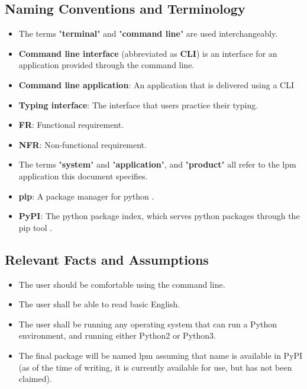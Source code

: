 \documentclass[12pt, titlepage]{article}
\begin{document}
\subsection{Naming Conventions and Terminology}
\begin{itemize}
    \item The terms "\textbf{terminal}" and "\textbf{command line}" are used interchangeably.
    \item \textbf{Command line interface} (abbreviated as \textbf{CLI}) is an interface for an application provided through the command line.
    \item \textbf{Command line application}: An application that is delivered using a CLI
    \item \textbf{Typing interface}: The interface that users practice their typing.
    \item \textbf{FR}: Functional requirement.
    \item \textbf{NFR}: Non-functional requirement.
    \item The terms "\textbf{system}" and "\textbf{application}", and "\textbf{product}" all refer to the lpm application this document specifies.
    \item \textbf{pip}: A package manager for python \citep{pip}.
    \item \textbf{PyPI}: The python package index, which serves python packages through the pip tool \citep{pypi}.
\end{itemize}

\subsection{Relevant Facts and Assumptions}
\begin{itemize}
    \item The user should be comfortable using the command line.
    \item The user shall be able to read basic English.
    \item The user shall be running any operating system that can run a Python environment, and running either Python2 or Python3.
    \item The final package will be named lpm assuming that name is available in PyPI (as of the time of writing, it is currently available for use, but has not been claimed).
\end{itemize}

\end{document}

